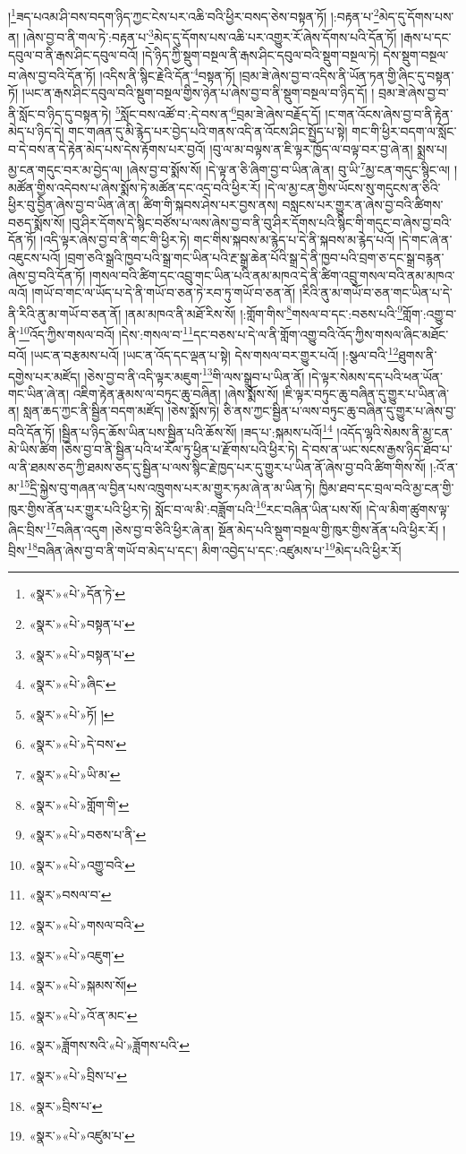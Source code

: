 །\footnote{«སྣར་»«པེ་»དོན་ཏེ་}ཟད་པའམ་ཤི་བས་བདག་ཉིད་ཀྱང་ངེས་པར་འཆི་བའི་ཕྱིར་བསད་ཅེས་བསྟན་ཏོ། །:བརྟན་པ་\footnote{«སྣར་»«པེ་»བསྟན་པ་}མེད་དུ་དོགས་པས་ན། །ཞེས་བྱ་བ་ནི་གལ་ཏེ་:བརྟན་པ་\footnote{«སྣར་»«པེ་»བསྟན་པ་}མེད་དུ་དོགས་པས་འཆི་པར་འགྱུར་རོ་ཞེས་དོགས་པའི་དོན་ཏོ། །རྒས་པ་དང་དབུལ་བ་ནི་རྒས་ཤིང་དབུལ་བའོ། །དེ་ཉིད་ཀྱི་སྡུག་བསྔལ་ནི་རྒས་ཤིང་དབུལ་བའི་སྡུག་བསྔལ་ཏེ། དེས་སྡུག་བསྔལ་བ་ཞེས་བྱ་བའི་དོན་ཏོ། །འདིས་ནི་སྙིང་རྗེའི་དོན་\footnote{«སྣར་»«པེ་»ཞིང་}བསྟན་ཏོ། །བྲམ་ཟེ་ཞེས་བྱ་བ་འདིས་ནི་ཡོན་ཏན་གྱི་ཞིང་དུ་བསྟན་ཏོ། །ཡང་ན་རྒས་ཤིང་དབུལ་བའི་སྡུག་བསྔལ་གྱིས་ཉེན་པ་ཞེས་བྱ་བ་ནི་སྡུག་བསྔལ་བ་ཉིད་དོ། །
བྲམ་ཟེ་ཞེས་བྱ་བ་ནི་སློང་བ་ཉིད་དུ་བསྟན་ཏེ། \footnote{«སྣར་»«པེ་»ཏོ། ། }སློང་བས་འཚོ་བ་:དེ་བས་ན་\footnote{«སྣར་»«པེ་»དེ་བས་}བྲམ་ཟེ་ཞེས་བརྗོད་དོ། །ང་གན་འོངས་ཞེས་བྱ་བ་ནི་རྟེན་མེད་པ་ཉིད་དེ། གང་གཞན་དུ་མི་རྙེད་པར་བྱེད་པའི་གནས་འདི་ན་འོངས་ཤིང་སྤྱོད་པ་སྟེ། གང་གི་ཕྱིར་བདག་ལ་སློང་བ་དེ་བས་ན་དེ་རྟེན་མེད་པས་དེས་རྟོགས་པར་བྱའོ། །བུ་ལ་མ་བལྟས་ན་ཇི་ལྟར་ཁྱོད་ལ་བལྟ་བར་བྱ་ཞེ་ན། སྨྲས་པ། མྱ་ངན་གདུང་བར་མ་བྱེད་ལ། །ཞེས་བྱ་བ་སྨོས་སོ། །དེ་ལྟ་ན་ཅི་ཞིག་བྱ་བ་ཡིན་ཞེ་ན། བུ་ཡི་\footnote{«སྣར་»«པེ་»ཡི་མ་}མྱ་ངན་གདུང་སྙིང་ལ། །མཚོན་གྱིས་འདེབས་པ་ཞེས་སྨོས་ཏེ་མཚོན་དང་འདྲ་བའི་ཕྱིར་རོ། །དེ་ལ་མྱ་ངན་གྱིས་ཡོངས་སུ་གདུངས་ན་ཅིའི་ཕྱིར་བུ་བྱིན་ཞེས་བྱ་བ་ཡིན་ཞེ་ན། ཚིག་གི་སྐབས་ཤེས་པར་བྱས་ནས། བསླངས་པར་གྱུར་ན་ཞེས་བྱ་བའི་ཚིགས་བཅད་སྨོས་སོ། །བུ་ཤིར་དོགས་དེ་སྙིང་བཙོས་པ་ལས་ཞེས་བྱ་བ་ནི་བུ་ཤིར་དོགས་པའི་སྙིང་གི་གདུང་བ་ཞེས་བྱ་བའི་དོན་ཏོ། །འདི་ལྟར་ཞེས་བྱ་བ་ནི་གང་གི་ཕྱིར་ཏེ། གང་གིས་སྐབས་མ་རྙེད་པ་དེ་ནི་སྐབས་མ་རྙེད་པའོ། །དེ་གང་ཞེ་ན་འཇུངས་པའོ། །བྲག་ཅའི་སྒྲའི་ཁྱབ་པའི་སྒྲ་གང་ཡིན་པའི་རྔ་སྒྲ་ཆེན་པོའི་སྒྲ་དེ་ནི་ཁྱབ་པའི་བྲག་ཅ་དང་སྒྲ་བརྙན་ཞེས་བྱ་བའི་དོན་ཏོ། །གསལ་བའི་ཚིག་དང་འབྲུ་གང་ཡིན་པའི་ནམ་མཁའ་དེ་ནི་ཚིག་འབྲུ་གསལ་བའི་ནམ་མཁའ་ལའོ། །གཡོ་བ་གང་ལ་ཡོད་པ་དེ་ནི་གཡོ་བ་ཅན་ཏེ་རབ་ཏུ་གཡོ་བ་ཅན་ནོ། །རིའི་ནུ་མ་གཡོ་བ་ཅན་གང་ཡིན་པ་དེ་ནི་རིའི་ནུ་མ་གཡོ་བ་ཅན་ནོ། །ནམ་མཁའ་ནི་མཐོ་རིས་སོ། །:གློག་གིས་\footnote{«སྣར་»«པེ་»གློག་གི་}གསལ་བ་དང་:བཅས་པའི་\footnote{«སྣར་»«པེ་»བཅས་པ་ནི་}གློག་:འགྱུ་བ་ནི་\footnote{«སྣར་»«པེ་»འགྱུ་བའི་}འོད་ཀྱིས་གསལ་བའོ། །དེས་:གསལ་བ་\footnote{«སྣར་»བསལ་བ་}དང་བཅས་པ་དེ་ལ་ནི་གློག་འགྱུ་བའི་འོད་ཀྱིས་གསལ་ཞིང་མཐོང་བའོ། །ཡང་ན་བརྩམས་པའོ། །ཡང་ན་འོད་དང་ལྡན་པ་སྟེ། དེས་གསལ་བར་གྱུར་པའོ། །:སྩལ་བའི་\footnote{«སྣར་»«པེ་»གསལ་བའི་}ཐུགས་ནི་དགྱེས་པར་མཛོད། །ཅེས་བྱ་བ་ནི་འདི་ལྟར་མཇུག་\footnote{«སྣར་»«པེ་»འཇུག་}གི་ལས་སྒྲུབ་པ་ཡིན་ནོ། །དེ་ལྟར་སེམས་དད་པའི་ཕན་ཡོན་གང་ཡིན་ཞེ་ན། འཇིག་རྟེན་རྣམས་ལ་བཏུང་ཆུ་བཞིན། །ཞེས་སྨོས་སོ། །ཇི་ལྟར་བཏུང་ཆུ་བཞིན་དུ་གྱུར་པ་ཡིན་ཞེ་ན། སླན་ཆད་ཀྱང་ནི་སྦྱིན་བདག་མཛོད། །ཅེས་སྨོས་ཏེ། ཅི་ནས་ཀྱང་སྦྱིན་པ་ལས་བཏུང་ཆུ་བཞིན་དུ་གྱུར་པ་ཞེས་བྱ་བའི་དོན་ཏོ། །སྦྱིན་པ་ཉིད་ཆོས་ཡིན་པས་སྦྱིན་པའི་ཆོས་སོ། །ཟད་པ་:སྐམས་པའོ།\footnote{«སྣར་»«པེ་»སྐམས་སོ།} །འདོད་ལྷའི་སེམས་ནི་མྱ་ངན་མེ་ཡིས་ཚིག །ཅེས་བྱ་བ་ནི་སྦྱིན་པའི་ཕ་རོལ་ཏུ་ཕྱིན་པ་རྫོགས་པའི་ཕྱིར་ཏེ། དེ་བས་ན་ཡང་སངས་རྒྱས་ཉིད་ཐོབ་པ་ལ་ནི་ཐམས་ཅད་ཀྱི་ཐམས་ཅད་དུ་སྦྱིན་པ་ལས་སྙིང་རྗེ་ཁྱད་པར་དུ་གྱུར་པ་ཡིན་ནོ་ཞེས་བྱ་བའི་ཚིག་གིས་སོ། །:འོ་ན་མ་\footnote{«སྣར་»«པེ་»འོ་ན་མང་}དྲི་སྐྱེས་བུ་གཞན་ལ་བྱིན་པས་འཁྲུགས་པར་མ་གྱུར་ཏམ་ཞེ་ན་མ་ཡིན་ཏེ། ཁྱིམ་ཐབ་དང་བྲལ་བའི་མྱ་ངན་གྱི་ཁུར་གྱིས་ནོན་པར་གྱུར་པའི་ཕྱིར་ཏེ། སློང་བ་ལ་མི་:བཟློག་པའི་\footnote{«སྣར་»ཟློགས་སའི་«པེ་»ཟློགས་པའི་}རང་བཞིན་ཡིན་པས་སོ། །དེ་ལ་མིག་ཚུགས་ལྟ་ཞིང་བྲིས་\footnote{«སྣར་»«པེ་»བྲིས་པ་}བཞིན་འདུག །ཅེས་བྱ་བ་ཅིའི་ཕྱིར་ཞེ་ན། སྔོན་མེད་པའི་སྡུག་བསྔལ་གྱི་ཁུར་གྱིས་ནོན་པའི་ཕྱིར་རོ། །བྲིས་\footnote{«སྣར་»བྲིས་པ་}བཞིན་ཞེས་བྱ་བ་ནི་གཡོ་བ་མེད་པ་དང་། མིག་འབྱེད་པ་དང་:འཛུམས་པ་\footnote{«སྣར་»«པེ་»འཛུམ་པ་}མེད་པའི་ཕྱིར་རོ། 